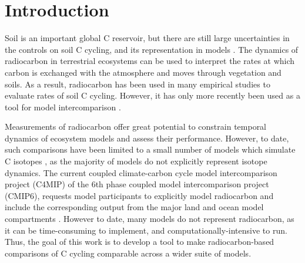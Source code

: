 \documentclass[11pt,a4paper]{article}
\newcommand{\gray}[1]{\textcolor{gray}{#1}}
\begin{document}
\newpage

\section{Introduction}

Soil is an important global C reservoir, but there are still large uncertainties in the controls on soil C cycling, and its representation in models \citep{Luo2016}. The dynamics of radiocarbon in terrestrial ecosystems can be used to interpret the rates at which carbon is exchanged with the atmosphere and moves through vegetation and soils. As a result, radiocarbon has been used in many empirical studies to evaluate rates of soil C cycling. However, it has only more recently been used as a tool for model intercomparison \citep{He2016}. 

Measurements of radiocarbon offer great potential to constrain temporal dynamics of ecosystem models and assess their performance. However, to date, such comparisons have been limited to a small number of models which simulate C isotopes \citep{Koven2013, Tifafi2018}, as the majority of models do not explicitly represent isotope dynamics. The current coupled climate-carbon cycle model intercomparison project (C4MIP) of the 6th phase coupled model intercomparison project (CMIP6), requests model participants to explicitly model radiocarbon and include the corresponding output from the major land and ocean model compartments \citep{Jones2016}. However to date, many models do not represent radiocarbon, as it can be time-consuming to implement, and computationally-intensive to run. Thus, the goal of this work is to develop a tool to make radiocarbon-based comparisons of C cycling comparable across a wider suite of models.
\end{document}
